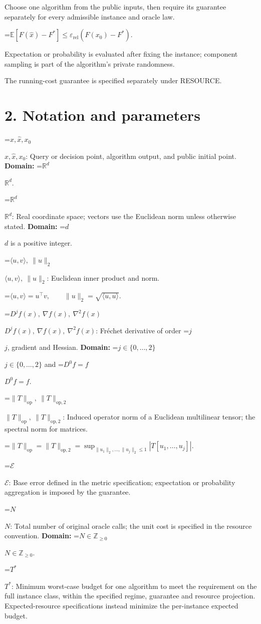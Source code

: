 \documentclass[10pt,a4paper]{article}
\newcommand{\AtlasMath}[1]{\par\begingroup\centering\setbox0=\hbox{$\displaystyle #1$}\ifdim\wd0>1.4\linewidth\typeout{ATLAS WIDE FORMULA: \the\wd0}\fi\ifdim\wd0>\linewidth\resizebox{\linewidth}{!}{\box0}\else\box0\fi\par\endgroup}
\newcommand{\AtlasInlineMath}[1]{\begingroup\setbox0=\hbox{$#1$}\ifdim\wd0>.4\linewidth\endgroup\AtlasMath{#1}\else\endgroup$#1$\fi}
\begin{document}
Choose one algorithm from the public inputs, then require its guarantee separately for every admissible instance and oracle law.


\AtlasMath{\mathbb{E}\!\left[F(\widehat{x})-F^*\right]\le \varepsilon_{\mathrm{rel}}(F(x_0)-F^*).}


Expectation or probability is evaluated after fixing the instance; component sampling is part of the algorithm's private randomness.

The running-cost guarantee is specified separately under RESOURCE.

\section{2. Notation and parameters}
\AtlasInlineMath{x,\widehat{x},x_0}: Query or decision point, algorithm output, and public initial point. \textbf{Domain:} \AtlasInlineMath{\mathbb{R}^d}.

\AtlasInlineMath{\mathbb{R}^d}: Real coordinate space; vectors use the Euclidean norm unless otherwise stated. \textbf{Domain:} \AtlasInlineMath{d} is a positive integer.

\AtlasInlineMath{\langle u,v\rangle,\ \|u\|_2}: Euclidean inner product and norm.


\AtlasMath{\langle u,v\rangle=u^\top v,\qquad\|u\|_2=\sqrt{\langle u,u\rangle}.}


\AtlasInlineMath{D^jf(x),\ \nabla f(x),\ \nabla^2f(x)}: Fréchet derivative of order \AtlasInlineMath{j}, gradient and Hessian. \textbf{Domain:} \AtlasInlineMath{j\in\{0,\ldots,2\}} and \AtlasInlineMath{D^0f=f}.

\AtlasInlineMath{\|T\|_{\mathrm{op}},\ \|T\|_{\mathrm{op},2}}: Induced operator norm of a Euclidean multilinear tensor; the spectral norm for matrices.


\AtlasMath{\|T\|_{\mathrm{op}}=\|T\|_{\mathrm{op},2}=\sup_{\|u_1\|_2,\ldots,\|u_j\|_2\le1}|T[u_1,\ldots,u_j]|.}


\AtlasInlineMath{\mathcal{E}}: Base error defined in the metric specification; expectation or probability aggregation is imposed by the guarantee.

\AtlasInlineMath{N}: Total number of original oracle calls; the unit cost is specified in the resource convention. \textbf{Domain:} \AtlasInlineMath{N\in\mathbb{Z}_{\ge0}}.

\AtlasInlineMath{T^*}: Minimum worst-case budget for one algorithm to meet the requirement on the full instance class, within the specified regime, guarantee and resource projection. Expected-resource specifications instead minimize the per-instance expected budget.
\end{document}
